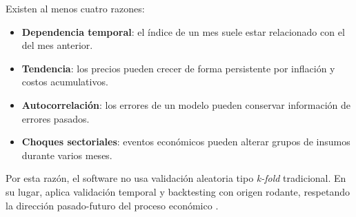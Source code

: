 Existen al menos cuatro razones:

\begin{itemize}
    \item \textbf{Dependencia temporal}: el índice de un mes suele estar relacionado con el del mes anterior.
    \item \textbf{Tendencia}: los precios pueden crecer de forma persistente por inflación y costos acumulativos.
    \item \textbf{Autocorrelación}: los errores de un modelo pueden conservar información de errores pasados.
    \item \textbf{Choques sectoriales}: eventos económicos pueden alterar grupos de insumos durante varios meses.
\end{itemize}

Por esta razón, el software no usa validación aleatoria tipo \textit{k-fold} tradicional. En su lugar, aplica validación temporal y backtesting con origen rodante, respetando la dirección pasado-futuro del proceso económico \parencite{hyndman_tscv_2021}.
